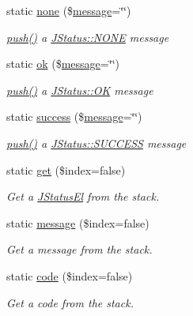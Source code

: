 \begin{DoxyCompactItemize}
static \hyperlink{classJStatus_a57ec832b91faf9ae63e080024a6f09cb}{none} (\$\hyperlink{classJStatus_aaae0b2dc83cdb147d18af1aa65abd353}{message}=\char`\"{}\char`\"{})
\begin{DoxyCompactList}\small\item\em \hyperlink{classJStatus_a4dfe11792482154033e973f8e595eb88}{push()} a \hyperlink{classJStatus_af4a8242bee3345146577233f7481d388}{J\-Status\-::\-N\-O\-N\-E} message \end{DoxyCompactList}\item 
static \hyperlink{classJStatus_afa2f0cf6b735f15788353d3216fb8cbd}{ok} (\$\hyperlink{classJStatus_aaae0b2dc83cdb147d18af1aa65abd353}{message}=\char`\"{}\char`\"{})
\begin{DoxyCompactList}\small\item\em \hyperlink{classJStatus_a4dfe11792482154033e973f8e595eb88}{push()} a \hyperlink{classJStatus_a8c12f03c803b6e2dd4408a2fa8e19fb0}{J\-Status\-::\-O\-K} message \end{DoxyCompactList}\item 
static \hyperlink{classJStatus_a40e18a7fc45b221189dddd13190f11a7}{success} (\$\hyperlink{classJStatus_aaae0b2dc83cdb147d18af1aa65abd353}{message}=\char`\"{}\char`\"{})
\begin{DoxyCompactList}\small\item\em \hyperlink{classJStatus_a4dfe11792482154033e973f8e595eb88}{push()} a \hyperlink{classJStatus_a894a1602e2b9594efa57e1a146fde7fa}{J\-Status\-::\-S\-U\-C\-C\-E\-S\-S} message \end{DoxyCompactList}\item 
static \hyperlink{classJStatus_a65c519fd5921f7b275aafe3c2e3c1f4e}{get} (\$index=false)
\begin{DoxyCompactList}\small\item\em Get a \hyperlink{classJStatusEl}{J\-Status\-El} from the stack. \end{DoxyCompactList}\item 
static \hyperlink{classJStatus_aaae0b2dc83cdb147d18af1aa65abd353}{message} (\$index=false)
\begin{DoxyCompactList}\small\item\em Get a message from the stack. \end{DoxyCompactList}\item 
static \hyperlink{classJStatus_abf45c135b0e7a85afcc29f4e6170dede}{code} (\$index=false)
\begin{DoxyCompactList}\small\item\em Get a code from the stack. \end{DoxyCompactList}\item 

\end{DoxyCompactItemize}
